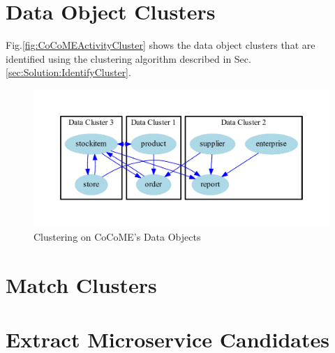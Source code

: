 \section{Data Object Clusters}
Fig.\ref{fig:CoCoMEActivityCluster} shows the data object clusters that are identified using the clustering algorithm described in Sec.\ref{sec:Solution:IdentifyCluster}.
\begin{figure}[h!]
	\centering
	\includegraphics[width=12cm, trim={2cm 0cm 2cm 0cm}]{img/CoCoMEDataClusterWith1.pdf}
	\caption{Clustering on CoCoME's Data Objects}
	\label{fig:CoCoMEDataCluster}
\end{figure}

\section{Match Clusters}

\section{Extract Microservice Candidates}
